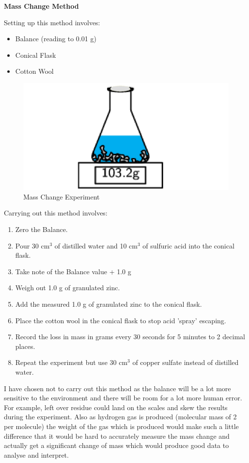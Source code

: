 \textbf{Mass Change Method}

Setting up this method involves:
\begin{itemize}
\item Balance (reading to 0.01 g)
\item Conical Flask
\item Cotton Wool
\end{itemize}

\begin{figure}[H]
    \includegraphics[width=\textwidth]{./Planning/Images/MassChange.pdf}
    \caption{Mass Change Experiment} \label{fig:Mass Change}
\end{figure}


Carrying out this method involves:

\begin{enumerate}
\item Zero the Balance.
\item Pour 30 cm$^3$ of distilled water and 10 cm$^3$ of sulfuric acid into the conical flask.
\item Take note of the Balance value + 1.0 g
\item Weigh out 1.0 g of granulated zinc.
\item Add the measured 1.0 g of granulated zinc to the conical flask.
\item Place the cotton wool in the conical flask to stop acid 'spray' escaping.
\item Record the loss in mass in grams every 30 seconds for 5 minutes to 2 decimal places.
\item Repeat the experiment but use 30 cm$^3$ of copper sulfate instead of distilled water.
\end{enumerate} 

I have chosen not to carry out this method as the balance will be a lot more sensitive to the environment and there will be room for a lot more human error. For example, left over residue could land on the scales and skew the results during the experiment. Also as hydrogen gas is produced (molecular mass of 2 per molecule) the weight of the gas which is produced would make such a little difference that it would be hard to accurately measure the mass change and actually get a significant change of mass which would produce good data to analyse and interpret. 


